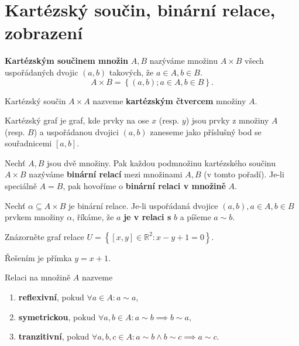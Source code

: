 \section{Kartézský součin, binární relace, zobrazení}
\begin{definition}
  \textbf{Kartézským součinem množin} $A,B$ nazýváme množinu $A\times B$ všech uspořádaných dvojic $(a,b)$ takových, že $a\in A,b\in B$.
  \[
    A \times B = \left \{ (a,b); a\in A,b\in B \right \}.
  \]
\end{definition}

\begin{pozn}
  Kartézský součin $A\times A$ nazveme \textbf{kartézským čtvercem} množiny $A$.
\end{pozn}

\begin{pozn}
  Kartézský graf je graf, kde prvky na ose $x$ (resp. $y$) jsou prvky z množiny $A$ (resp. $B$) a uspořádanou dvojici $(a,b)$ zaneseme jako příslušný bod se souřadnicemi $[a,b].$
\end{pozn}

\begin{definition}
  Nechť $A,B$ jsou dvě množiny. Pak každou podmnožinu kartézského součinu $A\times B$ nazýváme \textbf{binární relací} mezi množinami $A,B$
  (v tomto pořadí). Je-li speciálně $A=B$, pak hovoříme o \textbf{binární relaci v množině} $A$.
\end{definition}

\begin{definition}
Nechť $\alpha\subseteq A\times B$ je binární relace. Je-li uspořádaná dvojice $(a,b), a \in A, b \in B$ prvkem množiny $\alpha$,
říkáme, že $a$ \textbf{je v relaci s} $b$ a píšeme $a \sim b$.
\end{definition}

\begin{priklad}
Znázorněte graf relace $U=\left \{ \left [ x,y \right ]\in \mathbb R^2: x-y+1=0  \right \}. $
\end{priklad}

\begin{reseni}
Řešením je přímka $y=x+1.$
\end{reseni}

\begin{definition}\label{reflsymtran}
  Relaci na množině $A$ nazveme
  \begin{enumerate}[$i.$]
    \item \textbf{reflexivní}, pokud $\forall a\in A: a\sim a$,
    \item \textbf{symetrickou}, pokud $\forall a,b \in A: a\sim b \implies b\sim a,$
    \item \textbf{tranzitivní}, pokud $\forall a,b,c\in A: a\sim b \land b\sim c \implies a\sim c.$
  \end{enumerate}
\end{definition}

